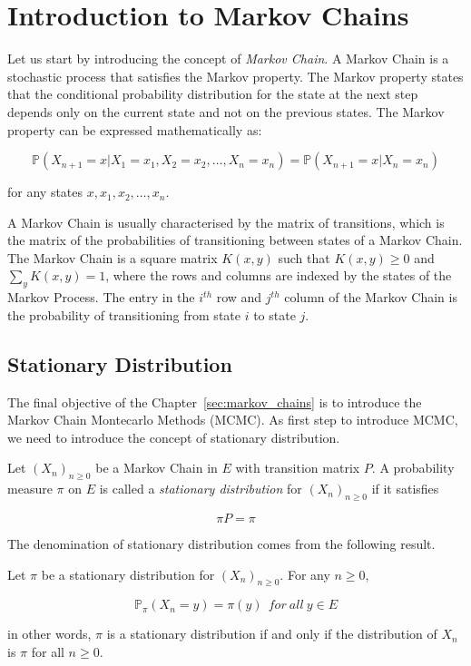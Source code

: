 \documentclass{report}
\begin{document}
\section{Introduction to Markov Chains}
\label{sec:introduction_markov_chains}

Let us start by introducing the concept of \textit{Markov Chain}. A Markov Chain is a stochastic process that satisfies the Markov property. The Markov property states that the conditional probability distribution for the state at the next step depends only on the current state and not on the previous states. The Markov property can be expressed mathematically as:

\[
	\mathbb{P}(X_{n+1} = x | X_1 = x_1, X_2 = x_2, \dots, X_n = x_n) = \mathbb{P}(X_{n+1} = x | X_n = x_n)
\]

for any states \(x, x_1, x_2, \dots, x_n\). 

A Markov Chain is usually characterised by the matrix of transitions, which is the matrix of the probabilities of transitioning between states of a Markov Chain. The Markov Chain is a square matrix $K(x,y)$ such that $K(x,y) \geq 0$ and \(\sum_{y} K(x,y) = 1\), where the rows and columns are indexed by the states of the Markov Process. The entry in the \(i^{th}\) row and \(j^{th}\) column of the Markov Chain is the probability of transitioning from state \(i\) to state \(j\).

\subsection{Stationary Distribution}
\label{sec:stationary_distribution}

The final objective of the Chapter~\ref{sec:markov_chains} is to introduce the Markov Chain Montecarlo Methods (MCMC). As first step to introduce MCMC, we need to introduce the concept of stationary distribution. 

\begin{definition}
	Let $(X_n)_{n \geq 0}$ be a Markov Chain in $E$ with transition matrix $P$. A probability measure $\pi$ on $E$ is called a \textit{stationary distribution} for $(X_n)_{n \geq 0}$ if it satisfies 
	
	\[
		\pi P = \pi
	\]
\end{definition}

The denomination of stationary distribution comes from the following result.

\begin{proposition}
	Let $\pi$ be a stationary distribution for $(X_n)_{n \geq 0}$. For any \(n \geq 0\),

	\[
		\mathbb{P}_\pi(X_n = y) = \pi(y) \ \ for \ all \ y \in E
	\]

	in other words, $\pi$ is a stationary distribution if and only if the distribution of $X_n$ is $\pi$ for all $n \geq 0$.
\end{proposition}
\end{document}

